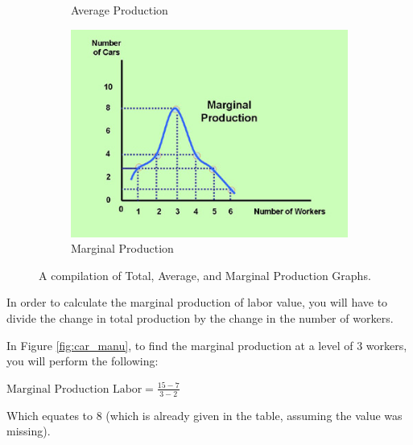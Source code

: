 \documentclass[a4paper, 12pt] {article}
\begin{document}
\begin{figure}[ht]
\begin{subfigure}{0.33\textwidth}
        \caption{Average Production}
        \label{fig:tot_avg}
    \end{subfigure}
    \hspace{1mm}
    \begin{subfigure}{0.33\textwidth}
        \centering
        \includegraphics[width=\textwidth] {marg_prod.jpg}
        \caption{Marginal Production}
        \label{fig:tot_marg}
    \end{subfigure}
    \caption{A compilation of Total, Average, and Marginal Production Graphs.}
    \label{fig:sep_prod_graphs}
\end{figure}

In order to calculate the marginal production of labor value, you will have to
divide the change in total production by the change in the number of workers.

In Figure \ref{fig:car_manu}, to find the marginal production at a level of 3
workers, you will perform the following:
\begin{description}
    \item  $\text{Marginal Production Labor} = \frac{15 - 7}{3 - 2}$
\end{description}
Which equates to 8 (which is already given in the table, assuming the value was
missing).
\end{document}
